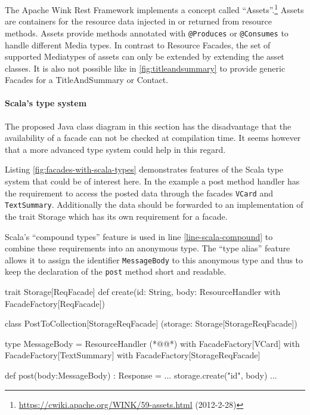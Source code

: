 \documentclass[11pt,a4paper,headsepline,twoside]{scrartcl}		%
\newcommand{\citeurl}[2]{\url{#1} (#2)}
\begin{document}
The Apache Wink Rest Framework implements a concept called
``Assets''.\footnote{\citeurl{https://cwiki.apache.org/WINK/59-assets.html}{2012-2-28}}
Assets are containers for the resource data injected in or returned from
resource methods. Assets provide methods annotated with \lstinline:@Produces: or
\lstinline:@Consumes: to handle different Media types. In contrast to Resource
Facades, the set of supported Mediatypes of assets can only be extended by
extending the asset classes. It is also not possible like in
\autoref{fig:titleandsummary} to provide generic Facades for a TitleAndSummary
or Contact.

\paragraph{Scala's type system}
The proposed Java class diagram in this section has the disadvantage that the
availability of a facade can not be checked at compilation time. It seems
however that a more advanced type system could help in this regard.

Listing \ref{fig:facades-with-scala-types} demonstrates features of the Scala
type system \cite{Odersky2011} that could be of interest here. In the example a
post method handler has the requirement to access the posted data through the
facades \lstinline:VCard: and \lstinline:TextSummary:. Additionally the data
should be forwarded to an implementation of the trait Storage which has its own
requirement for a facade.

Scala's ``compound types'' feature is used in line \ref{line-scala-compound} to
combine these requirements into an anonymous type. The ``type alias'' feature
allows it to assign the identifier \lstinline:MessageBody: to this anonymous
type and thus to keep the declaration of the \lstinline:post: method short and
readable.

\begin{javalisting}[label=fig:facades-with-scala-types,
                   numbers=left,
                   escapeinside={(*@}{@*)},
                   caption={Implementing the facades approach with Scala's type system}]
trait Storage[ReqFacade] {
 def create(id: String,
            body: ResourceHandler
                  with FacadeFactory[ReqFacade])
}

class PostToCollection[StorageReqFacade]
            (storage: Storage[StorageReqFacade]) {
 type MessageBody = ResourceHandler (*@\label{line-scala-compound}@*)
                    with FacadeFactory[VCard] 
                    with FacadeFactory[TextSummary]
                    with FacadeFactory[StorageReqFacade]
  
 def post(body:MessageBody) : Response = {
  ...
  storage.create("id", body)
  ...
 }
}
\end{javalisting}
\end{document}
